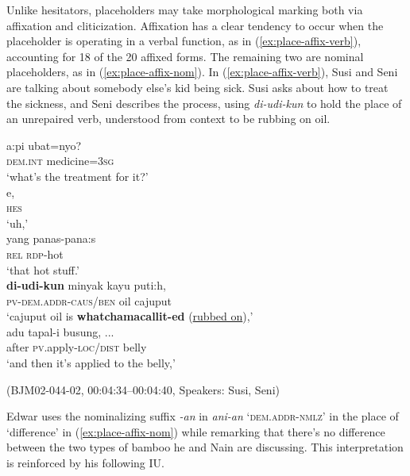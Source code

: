 \documentclass[output=paper,colorlinks,citecolor=brown
\ChapterDOI{10.5281/zenodo.15697585}
]{langscibook}
\begin{document}
Unlike hesitators, placeholders may take morphological marking both via affixation and cliticization. Affixation has a clear tendency to occur when the placeholder is operating in a verbal function, as in (\ref{ex:place-affix-verb}), accounting for 18 of the 20 affixed forms. The remaining two are nominal placeholders, as in (\ref{ex:place-affix-nom}). In (\ref{ex:place-affix-verb}), Susi and Seni are talking about somebody else's kid being sick. Susi asks about how to treat the sickness, and Seni describes the process, using \textit{di-udi-kun} to hold the place of an unrepaired verb, understood from context to be rubbing on oil. 

\begin{exe}
    \ex\label{ex:place-affix-verb} \begin{xlist}[0\quad →SU:]
         \gll
        a:pi ubat=nyo? \\
        \textsc{dem.int} medicine=3\textsc{sg} \\
        \glt `what's the treatment for it?' \\
         \gll
        e, \\
        \textsc{hes} \\
        \glt `uh,' \\
        \exi{3\quad \hphantom{→SE:}} \gll
        yang panas-pana:s \\
        \textsc{rel} \textsc{rdp}-hot \\
        \glt `that hot stuff.' \\
         \gll
        \textbf{di-udi-kun} minyak {kayu puti:h}, \\
        \textsc{pv}-\textsc{dem.addr}-\textsc{caus/ben} oil {cajuput} \\
        \glt `cajuput oil is \textbf{whatchamacallit-ed} (\uline{rubbed on}),' \\
        \exi{5\quad \hphantom{→SE:}} \gll
        adu tapal-i busung, ... \\
        after \textsc{pv}.apply-\textsc{loc/dist} belly \\
        \glt `and then it's applied to the belly,' \\
    \end{xlist}
    \hfill (BJM02-044-02, 00:04:34–00:04:40, Speakers: Susi, Seni) 
\end{exe}

Edwar uses the nominalizing suffix \textit{-an} in \textit{ani-an} `\textsc{dem.addr-nmlz}' in the place of `difference' in (\ref{ex:place-affix-nom}) while remarking that there's no difference between the two types of bamboo he and Nain are discussing. This interpretation is reinforced by his following IU.
\end{document}
